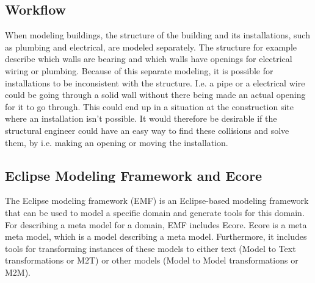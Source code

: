 \subsection{Workflow}
When modeling buildings, the structure of the building and its installations, such as plumbing and electrical, are modeled separately. The structure for example describe which walls are bearing and which walls have openings for electrical wiring or plumbing.  Because of this separate modeling, it is possible for installations to be inconsistent with the structure. I.e. a pipe or a electrical wire could be going through a solid wall without there being made an actual opening for it to go through. This could end up in a situation at the construction site where an installation isn't possible. It would therefore be desirable if the structural engineer could have an easy way to find these collisions and solve them, by i.e. making an opening or moving the installation.
\subsection{Eclipse Modeling Framework and Ecore}
The Eclipse modeling framework (EMF) is an Eclipse-based modeling framework that can be used to model a specific domain and generate tools for this domain. For describing a meta model for a domain, EMF includes Ecore. Ecore is a meta meta model, which is a model describing a meta model. Furthermore, it includes tools for transforming instances of these models to either text (Model to Text transformations or M2T) or other models (Model to Model transformations or M2M).